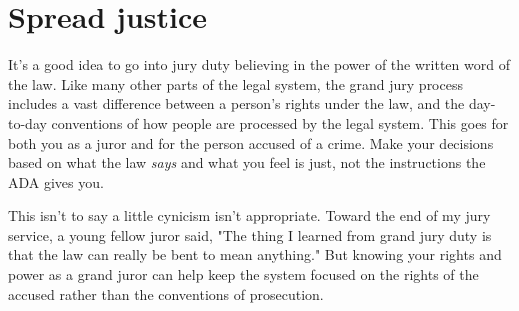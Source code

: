 \documentclass[letterpaper]{article}
\begin{document}
\section*{Spread justice}
It's a good idea to go into jury duty believing in the power of the written word of the law. 
Like many other parts of the legal system, the grand jury process includes a vast difference between a person's rights under the law, and the day-to-day conventions of how people are processed by the legal system.
This goes for both you as a juror and for the person accused of a crime.
Make your decisions based on what the law \emph{says} and what you feel is just, not the instructions the ADA gives you. 

This isn't to say a little cynicism isn't appropriate.
Toward the end of my jury service, a young fellow juror said, "The thing I learned from grand jury duty is that the law can really be bent to mean anything." 
But knowing your rights and power as a grand juror can help keep the system focused on the rights of the accused rather than the conventions of prosecution.



\theendnotes


 
\end{document}

